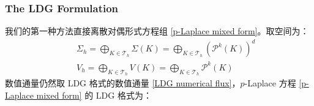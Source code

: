 \subsubsection{The LDG Formulation}


我们的第一种方法直接离散对偶形式方程组 \eqref{p-Laplace mixed form}。取空间为：
\begin{subequations}
	\begin{eqnarray}
		&& \Sigma_{h} = \bigoplus_{K \in \mathcal{T}_{h}} \Sigma(K) = \bigoplus_{K \in \mathcal{T}_{h}} \left(\mathscr{P}^{k}(K)\right)^{d} \\
		&& V_{h} = \bigoplus_{K \in \mathcal{T}_{h}} V(K) = \bigoplus_{K \in \mathcal{T}_{h}} \mathscr{P}^{k}(K)
	\end{eqnarray}
\end{subequations}
数值通量仍然取 LDG 格式的数值通量 \eqref{LDG numerical flux}，\(p\)-Laplace 方程 \eqref{p-Laplace mixed form} 的 LDG 格式为：
